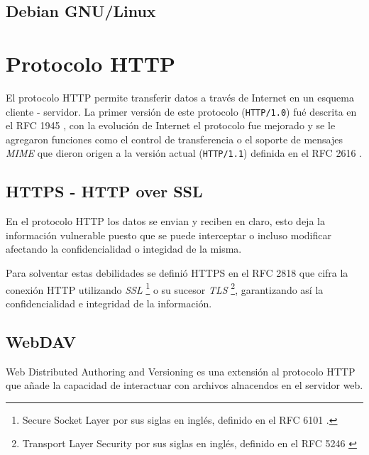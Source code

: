 
  \subsection {Debian GNU/Linux}

\section {Protocolo HTTP}

El protocolo \textsc{HTTP} permite transferir datos a trav\'{e}s de Internet en un esquema cliente - servidor. La primer versi\'{o}n de este protocolo (\verb|HTTP/1.0|) fu\'{e} descrita en el \textsc{RFC} 1945 \cite{_rfc_????-1}, con la evoluci\'{o}n de Internet el protocolo fue mejorado y se le agregaron funciones como el control de transferencia o el soporte de mensajes \textit{MIME} que dieron origen a la versi\'{o}n actual (\verb|HTTP/1.1|) definida en el RFC 2616 \cite{_rfc_????}.

  \subsection {HTTPS - HTTP over SSL}

En el protocolo \textsc{HTTP} los datos se envian y reciben en claro, esto deja la informaci\'{o}n vulnerable puesto que se puede interceptar o incluso modificar afectando la confidencialidad o integidad de la misma.

Para solventar estas debilidades se defini\'{o} \textsc{HTTPS} en el \textsc{RFC} 2818 \cite{_rfc_????-6} que cifra la conexi\'{o}n \textsc{HTTP} utilizando \textit{SSL} \footnote{Secure Socket Layer por sus siglas en ingl\'{e}s, definido en el \textsc{RFC} 6101 \cite{_rfc_????-4}.} o su sucesor \textit{TLS} \footnote{Transport Layer Security por sus siglas en ingl\'{e}s, definido en el \textsc{RFC} 5246 \cite{_rfc_????-3}}, garantizando as\'{i} la confidencialidad e integridad de la informaci\'{o}n.

  \subsection {WebDAV}

Web Distributed Authoring and Versioning es una extensi\'{o}n al protocolo \textsc{HTTP} que a\~{n}ade la capacidad de interactuar con archivos alnacendos en el servidor web.

